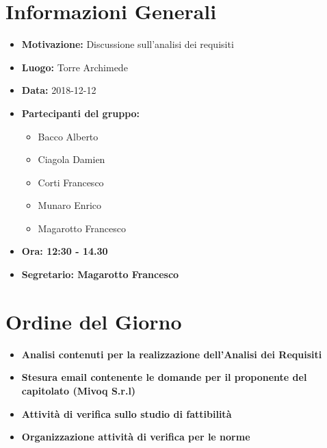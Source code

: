\documentclass[a4paper, oneside, openany, dvipsnames, table]{article}
\begin{document}
\copertina{}


\newpage
\tableofcontents
\newpage

\section{Informazioni Generali}
\begin{itemize}
\item \textbf{Motivazione:} Discussione sull'analisi dei requisiti
\item \textbf{Luogo:} Torre Archimede
\item \textbf{Data:} 2018-12-12
\item \textbf{Partecipanti del gruppo:}
	\begin{itemize}
	\item Bacco Alberto
	\item Ciagola Damien
	\item Corti Francesco
	\item Munaro Enrico
	\item Magarotto Francesco
	\end{itemize} 
\item \textbf{Ora: 12:30 - 14.30}
\item \textbf{Segretario: Magarotto Francesco}
\end{itemize}

\section{Ordine del Giorno}
\begin{itemize}
\item \textbf{Analisi contenuti per la realizzazione dell'Analisi dei Requisiti}
\item \textbf{Stesura email contenente le domande per il proponente del capitolato (Mivoq S.r.l)}
\item \textbf{Attività di verifica sullo studio di fattibilità}
\item \textbf{Organizzazione attività di verifica per le norme}
\end{itemize}
\end{document}
